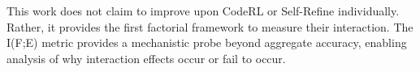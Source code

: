 
This work does not claim to improve upon CodeRL or Self-Refine individually. Rather, it provides the first factorial framework to measure their interaction. The I(F;E) metric provides a mechanistic probe beyond aggregate accuracy, enabling analysis of why interaction effects occur or fail to occur.


